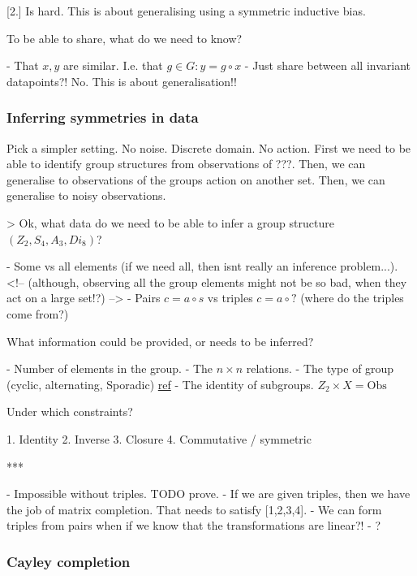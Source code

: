 [2.] Is hard. This is about generalising using a symmetric inductive bias.

To be able to share, what do we need to know?

- That $x, y$ are similar. I.e. that $g \in G: y = g\circ x$
- Just share between all invariant datapoints?! No. This is about generalisation!!

\subsubsection{Inferring symmetries in data}

Pick a simpler setting. No noise. Discrete domain. No action.
First we need to be able to identify group structures from observations of ???.
Then, we can generalise to observations of the groups action on another set.
Then, we can generalise to noisy observations.


> Ok, what data do we need to be able to infer a group structure $(Z_2, S_4, A_3, Di_8)$?

- Some vs all elements (if we need all, then isnt really an inference problem...).
<!-- (although, observing all the group elements might not be so bad, when they act on a large set!?) -->
- Pairs $c = a \circ s$ vs triples $c = a \circ ?$ (where do the triples come from?)

What information could be provided, or needs to be inferred?

- Number of elements in the group.
- The $n\times n$ relations.
- The type of group (cyclic, alternating, Sporadic) \href{https://en.wikipedia.org/wiki/Classification_of_finite_simple_groups}{ref}
- The identity of subgroups. $Z_2 \times X = \text{Obs}$

Under which constraints?

1. Identity
2. Inverse
3. Closure
4. Commutative / symmetric

***

- Impossible without triples. TODO prove.
- If we are given triples, then we have the job of matrix completion. That needs to satisfy [1,2,3,4].
- We can form triples from pairs when if we know that the transformations are linear?!
- ?

\subsubsection{Cayley completion}

